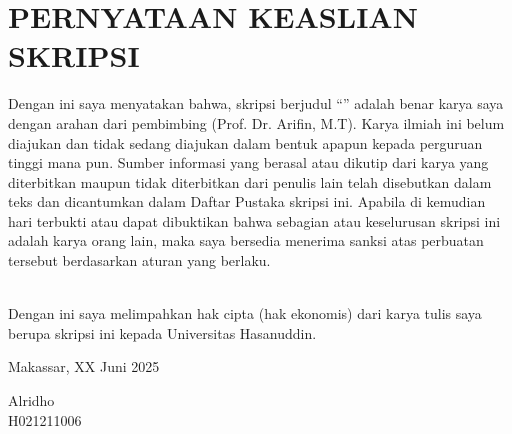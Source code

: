 \begingroup
\singlespacing
\chapter*{PERNYATAAN KEASLIAN SKRIPSI}
\noindent
Dengan ini saya menyatakan bahwa, skripsi berjudul “\textbf{\JudulSkripsi}”
adalah benar karya saya dengan arahan dari pembimbing (Prof. Dr.
Arifin, M.T). Karya ilmiah ini belum diajukan dan tidak sedang
diajukan dalam bentuk apapun kepada perguruan tinggi mana pun. Sumber
informasi yang berasal atau dikutip dari karya yang diterbitkan
maupun tidak diterbitkan dari penulis lain telah disebutkan dalam
teks dan dicantumkan dalam Daftar Pustaka skripsi ini. Apabila di
kemudian hari terbukti atau dapat dibuktikan bahwa sebagian atau
keselurusan skripsi ini adalah karya orang lain, maka saya bersedia
menerima sanksi atas perbuatan tersebut berdasarkan aturan yang berlaku. \par

\noindent
\\
Dengan ini saya melimpahkan hak cipta (hak ekonomis) dari karya tulis
saya berupa skripsi ini kepada Universitas Hasanuddin. \par

\vspace{2cm}

\hfill
\begin{minipage}{0.4\textwidth}
  \raggedleft
  Makassar, XX Juni 2025 \par
  \vspace{2cm}
  Alridho \\
  H021211006
\end{minipage}
\endgroup
